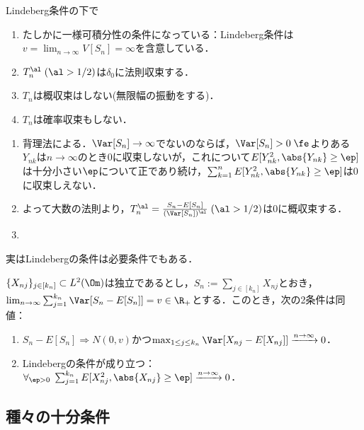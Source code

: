 \documentclass[uplatex,dvipdfmx]{jsreport}
\begin{document}
\begin{corollary}
    Lindeberg条件の下で
    \begin{enumerate}
        \item たしかに一様可積分性の条件になっている：Lindeberg条件は$v=\lim_{n\to\infty}V[S_n]=\infty$を含意している．
        \item $T_n^\al\;(\al>1/2)$は$\delta_0$に法則収束する．
        \item $T_n$は概収束はしない(無限幅の振動をする)．
        \item $T_n$は確率収束もしない．
    \end{enumerate}
\end{corollary}
\begin{Proof}\mbox{}
    \begin{enumerate}
        \item 背理法による．$\Var[S_n]\to\infty$でないのならば，$\Var[S_n]>0\;\fe$よりある$Y_{nk}$は$n\to\infty$のとき$0$に収束しないが，これについて$E[Y_{nk}^2,\abs{Y_{nk}}\ge\ep]$は十分小さい$\ep$について正であり続け，$\sum_{k=1}^nE[Y^2_{nk},\abs{Y_{nk}}\ge\ep]$は$0$に収束しえない．
        \item よって大数の法則より，$T_n^\al=\frac{S_n-E[S_n]}{(\Var[S_n])^\al}\;(\al>1/2)$は$0$に概収束する．
        \item 
    \end{enumerate}
\end{Proof}

\begin{remarks}
    実はLindebergの条件は必要条件でもある．
\end{remarks}
\begin{theorem}
    $\{X_{nj}\}_{j\in[k_n]}\subset L^2(\Om)$は独立であるとし，$S_n:=\sum_{j\in[k_n]}X_{nj}$とおき，$\lim_{n\to\infty}\sum_{j=1}^{k_n}\Var[S_n-E[S_n]]=v\in\R_+$とする．このとき，次の2条件は同値：
    \begin{enumerate}
        \item $S_{n}-E[S_n]\Rightarrow N(0,v)$かつ$\max_{1\le j\le k_n}\Var[X_{nj}-E[X_{nj}]]\xrightarrow{n\to\infty}0$．
        \item Lindebergの条件が成り立つ：$\forall_{\ep>0}\;\sum_{j=1}^{k_n}E[X_{nj}^2,\abs{X_{nj}}\ge\ep]\xrightarrow{n\to\infty}0$．
    \end{enumerate}
\end{theorem}

\subsection{種々の十分条件}
\end{document}
